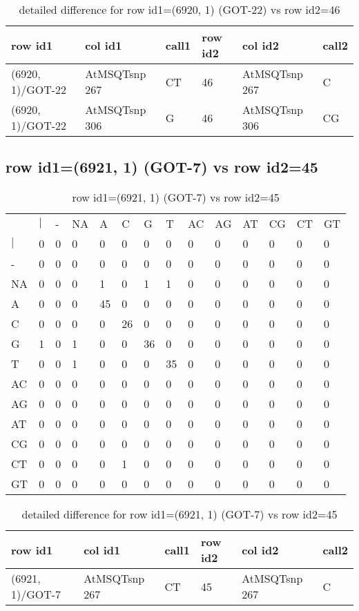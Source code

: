 \begin{center}
\begin{longtable}{|l|l|l|l|l|l|}
\caption{detailed difference for row id1=(6920, 1) (GOT-22) vs row id2=46} \label{table_dm107}\\
\hline
row id1&col id1&call1&row id2&col id2&call2\\
\hline
(6920, 1)/GOT-22&AtMSQTsnp 267&CT&46&AtMSQTsnp 267&C\\
(6920, 1)/GOT-22&AtMSQTsnp 306&G&46&AtMSQTsnp 306&CG\\
\hline
\end{longtable}
\end{center}

\subsection{row id1=(6921, 1) (GOT-7) vs row id2=45}
\begin{center}
\begin{longtable}{|l|l|l|l|l|l|l|l|l|l|l|l|l|l|}
\caption{row id1=(6921, 1) (GOT-7) vs row id2=45} \label{table_dm108}\\
\hline
\\
\hline
&$|$&-&NA&A&C&G&T&AC&AG&AT&CG&CT&GT\\
$|$&0&0&0&0&0&0&0&0&0&0&0&0&0\\
-&0&0&0&0&0&0&0&0&0&0&0&0&0\\
NA&0&0&0&1&0&1&1&0&0&0&0&0&0\\
A&0&0&0&45&0&0&0&0&0&0&0&0&0\\
C&0&0&0&0&26&0&0&0&0&0&0&0&0\\
G&1&0&1&0&0&36&0&0&0&0&0&0&0\\
T&0&0&1&0&0&0&35&0&0&0&0&0&0\\
AC&0&0&0&0&0&0&0&0&0&0&0&0&0\\
AG&0&0&0&0&0&0&0&0&0&0&0&0&0\\
AT&0&0&0&0&0&0&0&0&0&0&0&0&0\\
CG&0&0&0&0&0&0&0&0&0&0&0&0&0\\
CT&0&0&0&0&1&0&0&0&0&0&0&0&0\\
GT&0&0&0&0&0&0&0&0&0&0&0&0&0\\
\hline
\end{longtable}
\end{center}

\begin{center}
\begin{longtable}{|l|l|l|l|l|l|}
\caption{detailed difference for row id1=(6921, 1) (GOT-7) vs row id2=45} \label{table_dm109}\\
\hline
row id1&col id1&call1&row id2&col id2&call2\\
\hline
(6921, 1)/GOT-7&AtMSQTsnp 267&CT&45&AtMSQTsnp 267&C\\
\hline
\end{longtable}
\end{center}

